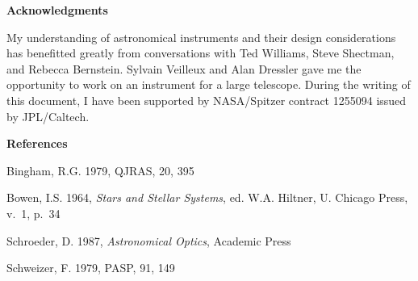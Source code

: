 \documentclass[12pt]{article}
\begin{document}


\vspace{1 in}

\bigskip


{\bf Acknowledgments}

My understanding of astronomical instruments and their design
considerations has benefitted greatly from conversations with
Ted Williams, Steve Shectman, and Rebecca Bernstein.
Sylvain Veilleux and Alan Dressler gave me the opportunity to
work on an instrument for a large telescope.  During the
writing of this document, I have been supported by 
NASA/Spitzer contract 1255094 issued by JPL/Caltech.

\bigskip

{\bf References}

Bingham, R.G. 1979, QJRAS, 20, 395

Bowen, I.S. 1964, {\it Stars and Stellar Systems}, ed. W.A. Hiltner,
U. Chicago Press, v.\ 1, p.\ 34

Schroeder, D. 1987, {\it Astronomical Optics}, Academic Press

Schweizer, F. 1979, PASP, 91, 149
\end{document}
